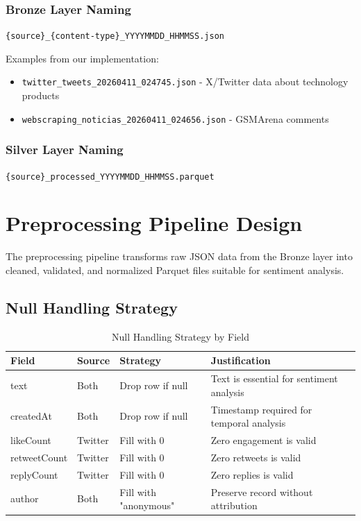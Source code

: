 \documentclass[11pt,a4paper]{article}
\begin{document}
\subsubsection{Bronze Layer Naming}
\texttt{\{source\}\_\{content-type\}\_YYYYMMDD\_HHMMSS.json}

Examples from our implementation:
\begin{itemize}
    \item \texttt{twitter\_tweets\_20260411\_024745.json} - X/Twitter data about technology products
    \item \texttt{webscraping\_noticias\_20260411\_024656.json} - GSMArena comments
\end{itemize}

\subsubsection{Silver Layer Naming}
\texttt{\{source\}\_processed\_YYYYMMDD\_HHMMSS.parquet}

\section{Preprocessing Pipeline Design}

The preprocessing pipeline transforms raw JSON data from the Bronze layer into cleaned, validated, and normalized Parquet files suitable for sentiment analysis.

\subsection{Null Handling Strategy}

\begin{table}[H]
\centering
\begin{tabular}{>{\ttfamily}l l l l}
\toprule
\textbf{Field} & \textbf{Source} & \textbf{Strategy} & \textbf{Justification} \\
\midrule
text & Both & Drop row if null & Text is essential for sentiment analysis \\
createdAt & Both & Drop row if null & Timestamp required for temporal analysis \\
likeCount & Twitter & Fill with 0 & Zero engagement is valid \\
retweetCount & Twitter & Fill with 0 & Zero retweets is valid \\
replyCount & Twitter & Fill with 0 & Zero replies is valid \\
author & Both & Fill with "anonymous" & Preserve record without attribution \\
\bottomrule
\end{tabular}
\caption{Null Handling Strategy by Field}
\label{tab:null-handling}
\end{table}
\end{document}
